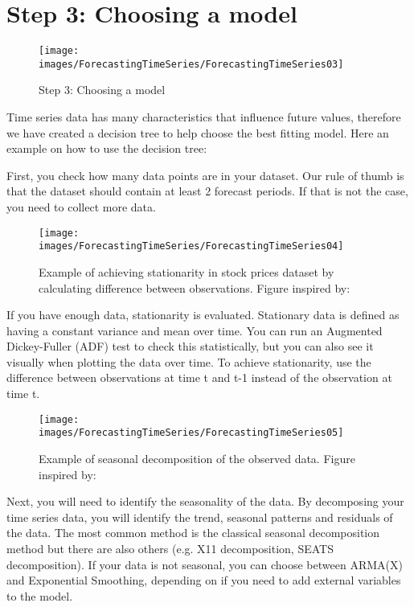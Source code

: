 \section{Step 3: Choosing a model}

\begin{figure}
    \texttt{[image: images/ForecastingTimeSeries/ForecastingTimeSeries03]}
    \caption{Step 3: Choosing a model} \label{ForecastingTimeSeries03}
\end{figure}

Time series data has many characteristics that influence future values, therefore we have created a decision tree to help choose the best fitting model. Here an example on how to use the decision tree:

First, you check how many data points are in your dataset. Our rule of thumb is that the dataset should contain at least 2 forecast periods. If that is not the case, you need to collect more data.

\begin{figure}
    \texttt{[image: images/ForecastingTimeSeries/ForecastingTimeSeries04]}
    \caption{Example of achieving stationarity in stock prices dataset by calculating difference between observations. Figure inspired by: } \label{ForecastingTimeSeries04}
\end{figure}


If you have enough data, stationarity is evaluated. Stationary data is defined as having a constant variance and mean over time. You can run an Augmented Dickey-Fuller (ADF) test to check this statistically, but you can also see it visually when plotting the data over time. To achieve stationarity, use the difference between observations at time t and t-1 instead of the observation at time t.

\begin{figure}
    \texttt{[image: images/ForecastingTimeSeries/ForecastingTimeSeries05]}
    \caption{Example of seasonal decomposition of the observed data. Figure inspired by: } \label{ForecastingTimeSeries05}
\end{figure}

Next, you will need to identify the seasonality of the data. By decomposing your time series data, you will identify the trend, seasonal patterns and residuals of the data. The most common method is the classical seasonal decomposition method but there are also others (e.g. X11 decomposition, SEATS decomposition). If your data is not seasonal, you can choose between ARMA(X) and Exponential Smoothing, depending on if you need to add external variables to the model.

